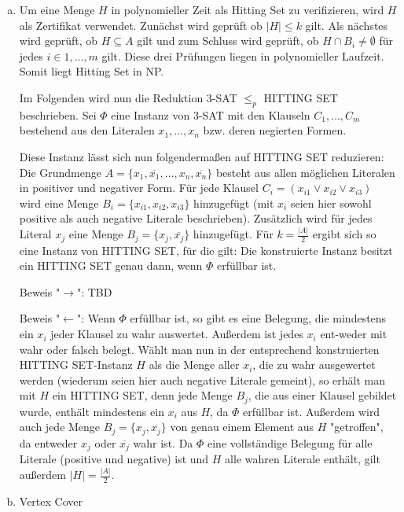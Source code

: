\documentclass[12pt,a4paper]{article}
\begin{document}
\begin{enumerate}[a)]

	\item Um eine Menge $H$ in polynomieller Zeit als Hitting Set zu verifizieren, wird $H$ als Zertifikat verwendet.
	Zunächst wird geprüft ob $|H|\le k$ gilt. Als nächstes wird geprüft, ob $H \subseteq A$ gilt und zum Schluss wird geprüft, ob $H \cap B_i \neq \emptyset$ für jedes $i \in {1,\dots,m}$ gilt.
	Diese drei Prüfungen liegen in polynomieller Laufzeit. Somit liegt Hitting Set in NP.
	
	Im Folgenden wird nun die Reduktion 3-SAT \(\le_p\) HITTING SET beschrieben. Sei \(\Phi\) eine Instanz von 3-SAT mit den Klauseln \(C_1, \dots, C_m\) bestehend aus den Literalen \(x_1, \dots, x_n\) bzw. deren negierten Formen.
	
	Diese Instanz lässt sich nun folgendermaßen auf HITTING SET reduzieren: Die Grundmenge \(A = \{x_1, \overline{x_1}, \dots, x_n, \overline{x_n}\}\) besteht aus allen möglichen Literalen in positiver und negativer Form. Für jede Klausel \(C_i = (x_{i1} \lor x_{i2} \lor x_{i3})\) wird eine Menge \(B_i = \{x_{i1}, x_{i2}, x_{i3}\}\) hinzugefügt (mit \(x_{i}\) seien hier sowohl positive als auch negative Literale beschrieben). Zusätzlich wird für jedes Literal \(x_j\) eine Menge \(B_j = \{x_j, \overline{x_j}\}\) hinzugefügt. Für \(k = \frac{|A|}{2}\) ergibt sich so eine Instanz von HITTING SET, für die gilt: Die konstruierte Instanz besitzt ein HITTING SET genau dann, wenn \(\Phi\) erfüllbar ist.
	
	Beweis "\(\rightarrow\)": TBD
	
	Beweis "\(\leftarrow\)": Wenn \(\Phi\) erfüllbar ist, so gibt es eine Belegung, die mindestens ein \(x_i\) jeder Klausel zu wahr auswertet. Außerdem ist jedes \(x_i\) ent-weder mit wahr oder falsch belegt. Wählt man nun in der entsprechend konstruierten HITTING SET-Instanz \(H\) als die Menge aller \(x_i\), die zu wahr ausgewertet werden (wiederum seien hier auch negative Literale gemeint), so erhält man mit \(H\) ein HITTING SET, denn jede Menge \(B_j\), die aus einer Klausel gebildet wurde, enthält mindestens ein \(x_i\) aus \(H\), da \(\Phi\) erfüllbar ist. Außerdem wird auch jede Menge \(B_j = \{x_j, \overline{x_j}\}\) von genau einem Element aus \(H\) "getroffen", da entweder \(x_j\) oder \(\overline{x_j}\) wahr ist. Da \(\Phi\) eine vollständige Belegung für alle Literale (positive und negative) ist und \(H\) alle wahren Literale enthält, gilt außerdem \(|H| = \frac{|A|}{2}\).

	\item Vertex Cover

\end{enumerate}
\end{document}
